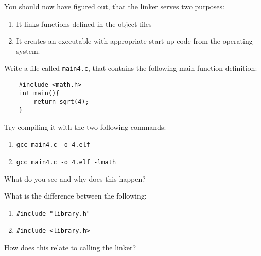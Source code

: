 \documentclass{dcbl/challenge}
\begin{document}
\begin{aufgabe}
    You should now have figured out, that the linker serves two purposes:
    \begin{enumerate}
        \item It links functions defined in the object-files
        \item It creates an executable with appropriate start-up code from the operating-system.
    \end{enumerate}
    Write a file called \texttt{main4.c}, that contains the following main function definition:
    \begin{lstlisting}
    #include <math.h>
    int main(){
        return sqrt(4);
    }
    \end{lstlisting}
    Try compiling it with the two following commands:
    \begin{enumerate}
        \item \texttt{gcc main4.c -o 4.elf}
        \item \texttt{gcc main4.c -o 4.elf -lmath}
    \end{enumerate}
    What do you see and why does this happen?
\end{aufgabe}

\begin{aufgabe}
    What is the difference between the following:
    \begin{enumerate}
        \item \texttt{\#include "library.h"}
        \item \texttt{\#include <library.h>}
    \end{enumerate}
    How does this relate to calling the linker?
\end{aufgabe}
\end{document}
